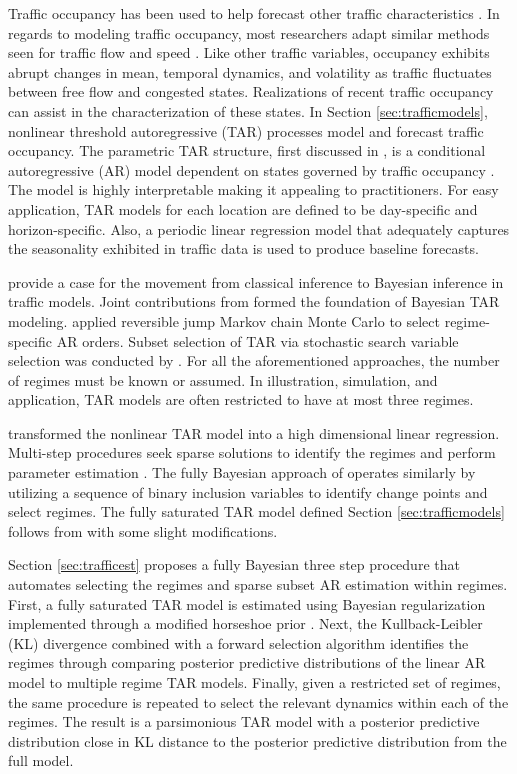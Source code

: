 Traffic occupancy has been used to help forecast other traffic characteristics \citep{Hazelton2004}.  In regards to modeling traffic occupancy, most researchers adapt similar methods seen for traffic flow and speed \citep{Kamarianakis2010}. Like other traffic variables, occupancy exhibits abrupt changes in mean, temporal dynamics, and volatility as traffic fluctuates between free flow and congested states. Realizations of recent traffic occupancy can assist in the characterization of these states. In Section \ref{sec:trafficmodels}, nonlinear threshold autoregressive (TAR) processes  model and forecast traffic occupancy. The parametric TAR structure, first discussed in \cite{Tong1990}, is a conditional autoregressive (AR) model dependent on states governed by traffic occupancy . The model is highly interpretable making it appealing to practitioners. For easy application, TAR models for each location are defined to be day-specific and horizon-specific. Also, a periodic linear regression model that adequately captures the seasonality exhibited in traffic data is used to produce baseline forecasts.

\cite{Ghosh2007} provide a case for the movement from classical inference to Bayesian inference in traffic models. Joint contributions from \cite{Broemeling1992,Geweke1993,Chen1995} formed the foundation of Bayesian TAR modeling. \cite{Campbell2004} applied reversible jump Markov chain Monte Carlo to select regime-specific AR orders. Subset selection of TAR via stochastic search variable selection \citep{George1993} was conducted by \citet{So2003,Chen2011}. For all the aforementioned approaches, the number of regimes must be known or assumed. In illustration, simulation, and application, TAR models are often restricted to have at most three regimes. 

\cite{Chan2015} transformed the nonlinear TAR model into a high dimensional linear regression. Multi-step procedures seek sparse solutions to identify the regimes and perform parameter estimation \citep{Chan2015,Chan2017}. The fully Bayesian approach of \cite{Pan2017} operates similarly by utilizing a sequence of binary inclusion variables to identify change points and select regimes. The fully saturated TAR model defined Section \ref{sec:trafficmodels} follows from \cite{Chan2015} with some slight modifications. 

Section \ref{sec:trafficest} proposes a fully Bayesian three step  procedure that automates selecting the regimes and sparse subset AR estimation within regimes. First, a fully saturated TAR model is estimated using Bayesian regularization implemented through a modified horseshoe prior \citep{Carvalho2009,Carvalho2010,Bhadra2016}. Next, the Kullback-Leibler (KL) divergence \citep{Kullback1951} combined with a forward selection algorithm identifies the regimes through comparing posterior predictive distributions of the linear AR model to multiple regime TAR models. Finally, given a restricted set of regimes, the same procedure is repeated to select the relevant dynamics within each of the regimes. The result is a parsimonious TAR model with a posterior predictive distribution close in KL distance to the posterior predictive distribution from the full model.


